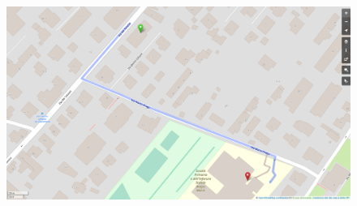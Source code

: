 \documentclass[10pt, aspectratio=169, compress, protectframetitle, handout]{beamer}
\begin{document}
\begin{frame}[noframenumbering]{}

    \vspace*{-10pt}
    \begin{figure}
        \centering
        \hspace*{-13pt}
        \includegraphics[scale=0.36]{figures/Distanza 7998556-7998442 v2}
    \end{figure}
    
\end{frame}
\end{document}
